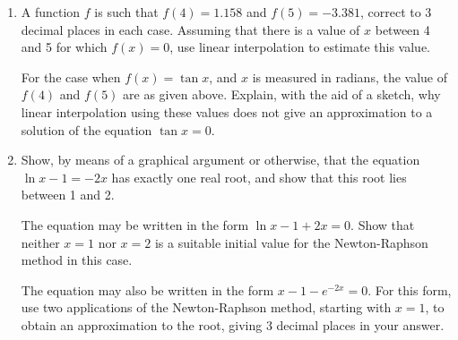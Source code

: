 \begin{problem}
    \begin{enumerate}
        \item A function $f$ is such that $f(4) = 1.158$ and $f(5) = -3.381$, correct to 3 decimal places in each case. Assuming that there is a value of $x$ between 4 and 5 for which $f(x) = 0$, use linear interpolation to estimate this value.
        
        For the case when $f(x) = \tan x$, and $x$ is measured in radians, the value of $f(4)$ and $f(5)$ are as given above. Explain, with the aid of a sketch, why linear interpolation using these values does not give an approximation to a solution of the equation $\tan x = 0$.

        \item Show, by means of a graphical argument or otherwise, that the equation $\ln{x-1} = -2x$ has exactly one real root, and show that this root lies between 1 and 2. 
        
        The equation may be written in the form $\ln{x-1} + 2x = 0$. Show that neither $x=1$ nor $x=2$ is a suitable initial value for the Newton-Raphson method in this case.

        The equation may also be written in the form $x - 1 - e^{-2x} = 0$. For this form, use two applications of the Newton-Raphson method, starting with $x=1$, to obtain an approximation to the root, giving 3 decimal places in your answer.
    \end{enumerate}
\end{problem}
